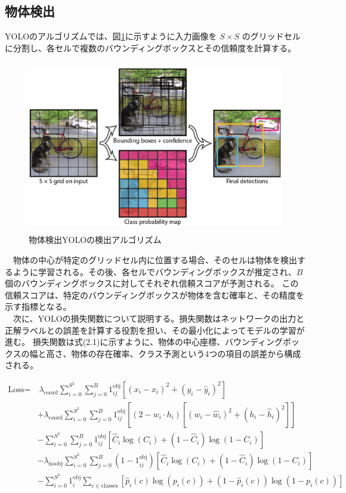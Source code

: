 \subsection{物体検出}
YOLOのアルゴリズムでは、図\ref{fig:f4}に示すように入力画像を $S \times S$ のグリッドセルに分割し、各セルで複数のバウンディングボックスとその信頼度を計算する。\\
\begin{figure}[htbt]
	\centering
	 \includegraphics[height=75mm]{Figure/YOLO.eps}
	 \caption{物体検出YOLOの検出アルゴリズム}
	 \label{fig:f4}
\end{figure}
　物体の中心が特定のグリッドセル内に位置する場合、そのセルは物体を検出するように学習される。その後、各セルでバウンディングボックスが推定され、$B$個のバウンディングボックスに対してそれぞれ信頼スコアが予測される。
この信頼スコアは、特定のバウンディングボックスが物体を含む確率と、その精度を示す指標となる。\\
　次に、YOLOの損失関数について説明する。損失関数はネットワークの出力と正解ラベルとの誤差を計算する役割を担い、その最小化によってモデルの学習が進む。
損失関数は式(2.1)に示すように、物体の中心座標、バウンディングボックスの幅と高さ、物体の存在確率、クラス予測という4つの項目の誤差から構成される。

\begin{align*}
	\text{Loss} = 
	&\ \lambda_{\text{coord}} \sum_{i=0}^{S^2} \sum_{j=0}^{B} 1^{\text{obj}}_{ij} 
	\left[ (x_i - \hat{x}_i)^2 + (y_i - \hat{y}_i)^2 \right] \\
	&+ \lambda_{\text{coord}} \sum_{i=0}^{S^2} \sum_{j=0}^{B} 1^{\text{obj}}_{ij} 
	\left[ (2 - w_i \cdot h_i) \left[ (w_i - \hat{w}_i)^2 + (h_i - \hat{h}_i)^2 \right] \right] \\
	&- \sum_{i=0}^{S^2} \sum_{j=0}^{B} 1^{\text{obj}}_{ij} 
	\left[ \hat{C}_i \log(C_i) + (1 - \hat{C}_i) \log(1 - C_i) \right] \\
	&- \lambda_{\text{noobj}} \sum_{i=0}^{S^2} \sum_{j=0}^{B} (1 - 1^{\text{obj}}_{ij}) 
	\left[ \hat{C}_i \log(C_i) + (1 - \hat{C}_i) \log(1 - C_i) \right] \\
	&- \sum_{i=0}^{S^2} 1^{\text{obj}}_i \sum_{c \in \text{classes}} 
	\left[ \hat{p}_i(c) \log(p_i(c)) + (1 - \hat{p}_i(c)) \log(1 - p_i(c)) \right]
	\tag{2.1}
\end{align*}

